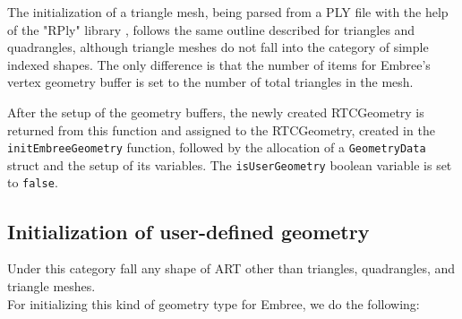 The initialization of a triangle mesh, being parsed from a PLY file with the help of the "RPly" library \cite{rply2016}, follows the same outline described for triangles and quadrangles, although triangle meshes do not fall into the category of simple indexed shapes. The only difference is that the number of items for Embree's vertex geometry buffer is set to the number of total triangles in the mesh.

After the setup of the geometry buffers, the newly created RTCGeometry is returned from this function and assigned to the RTCGeometry, created in the \texttt{initEmbreeGeometry} function, followed by the allocation of a \texttt{GeometryData} struct and the setup of its variables. The \texttt{isUserGeometry} boolean variable is set to \texttt{false}.

\subsection{Initialization of user-defined geometry}
\label{sec:init_user}
Under this category fall any shape of ART other than triangles, quadrangles, and triangle meshes.
\\

For initializing this kind of geometry type for Embree, we do the following:

